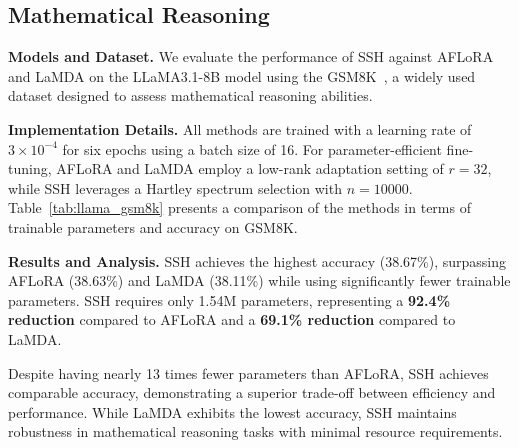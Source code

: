 \subsection{Mathematical Reasoning}

\noindent \textbf{Models and Dataset.} We evaluate the performance of SSH against AFLoRA and LaMDA on the LLaMA3.1-8B model using the GSM8K~\cite{cobbe2021training}, a widely used dataset designed to assess mathematical reasoning abilities.

\noindent \textbf{Implementation Details.} All methods are trained with a learning rate of $3\times10^{-4}$ for six epochs using a batch size of 16. For parameter-efficient fine-tuning, AFLoRA and LaMDA employ a low-rank adaptation setting of $r=32$, while SSH leverages a Hartley spectrum selection with $n=10000$. Table~\ref{tab:llama_gsm8k} presents a comparison of the methods in terms of trainable parameters and accuracy on GSM8K.

\begin{table}[!t]
    \centering
    \caption{Comparison of SSH with AFLoRA and LaMDA on LLaMA3.1-8B for GSM8K. Accuracy is reported as a percentage.}
    \label{tab:llama_gsm8k}
\end{table}

\noindent \textbf{Results and Analysis.} SSH achieves the highest accuracy (38.67\%), surpassing AFLoRA (38.63\%) and LaMDA (38.11\%) while using significantly fewer trainable parameters. SSH requires only 1.54M parameters, representing a \textbf{92.4\% reduction} compared to AFLoRA and a \textbf{69.1\% reduction} compared to LaMDA. 

Despite having nearly 13 times fewer parameters than AFLoRA, SSH achieves comparable accuracy, demonstrating a superior trade-off between efficiency and performance. While LaMDA exhibits the lowest accuracy, SSH maintains robustness in mathematical reasoning tasks with minimal resource requirements.


